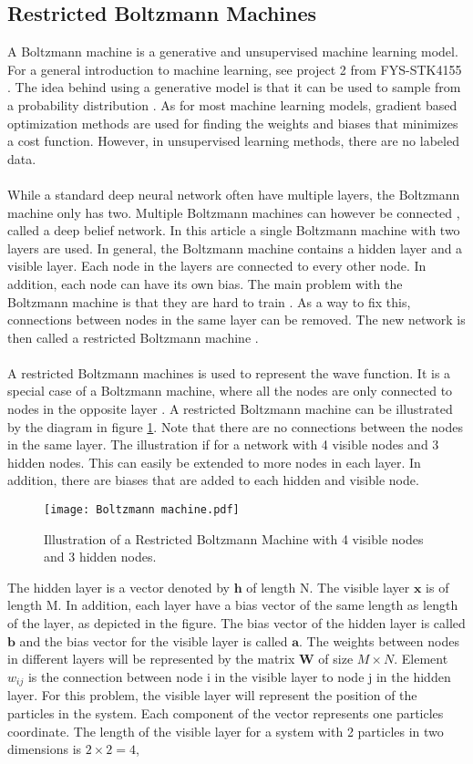 \subsection{Restricted Boltzmann Machines}
A Boltzmann machine is a generative and unsupervised machine learning model. For a general introduction to machine learning, see project 2 from FYS-STK4155 \cite{4155}. The idea behind using a generative model is that it can be used to sample from a probability distribution \cite{mhj_ml}. As for most machine learning models, gradient based optimization methods are used for finding the weights and biases that minimizes a cost function. However, in unsupervised learning methods, there are no labeled data. 
\\
\\
While a standard deep neural network often have multiple layers, the Boltzmann machine only has two. Multiple Boltzmann machines can however be connected \cite{mhj_ml}, called a deep belief network. In this article a single Boltzmann machine with two layers are used. In general, the Boltzmann machine contains a hidden layer and a visible layer. Each node in the layers are connected to every other node. In addition, each node can have its own bias. The main problem with the Boltzmann machine is that they are hard to train \cite{mhj_ml}. As a way to fix this, connections between nodes in the same layer can be removed. The new network is then called a restricted Boltzmann machine \cite{mhj_ml}.
\\
\\
A restricted Boltzmann machines is used to represent the wave function. It is a special case of a Boltzmann machine, where all the nodes are only connected to nodes in the opposite layer \cite{mhj_ml}.  A restricted Boltzmann machine can be illustrated by the diagram in figure \ref{fig:bm}. Note that there are no connections between the nodes in the same layer. The illustration if for a network with 4 visible nodes and 3 hidden nodes. This can easily be extended to more nodes in each layer. In addition, there are biases that are added to each hidden and visible node. 
\begin{figure}[h!]
    \centering
    \texttt{[image: Boltzmann machine.pdf]}
    \caption{Illustration of a Restricted Boltzmann Machine with 4 visible nodes and 3 hidden nodes.}
    \label{fig:bm}
\end{figure}
The hidden layer is a vector denoted by $\boldsymbol{h}$ of length N. The visible layer $\boldsymbol{x}$ is of length M. In addition, each layer have a bias vector of the same length as length of the layer, as depicted in the figure. The bias vector of the hidden layer is called $\boldsymbol{b}$ and the bias vector for the visible layer is called $\boldsymbol{a}$. The weights between nodes in different layers will be represented by the matrix $\boldsymbol{W}$ of size $M \times N$. Element $w_{ij}$ is the connection between node i in the visible layer to node j in the hidden layer. For this problem, the visible layer will represent the position of the particles in the system. Each component of the vector represents one particles coordinate. The length of the visible layer for a system with 2 particles in two dimensions is $2\times2 = 4$,
